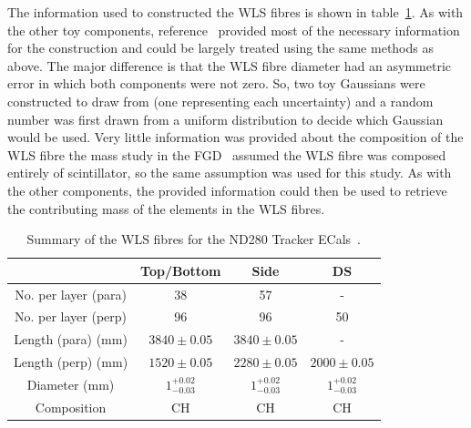 \label{subsubsec:ECalMassWLSFibres}
The information used to constructed the WLS fibres is shown in table~\ref{table:WLSFibreDimensions}.  As with the other toy components, reference~\cite{1748-0221-8-10-P10019} provided most of the necessary information for the construction and could be largely treated using the same methods as above.  The major difference is that the WLS fibre diameter had an asymmetric error in which both components were not zero.  So, two toy Gaussians were constructed to draw from (one representing each uncertainty) and a random number was first drawn from a uniform distribution to decide which Gaussian would be used.  Very little information was provided about the composition of the WLS fibre the mass study in the FGD~\cite{FGDMassTN} assumed the WLS fibre was composed entirely of scintillator, so the same assumption was used for this study.  As with the other components, the provided information could then be used to retrieve the contributing mass of the elements in the WLS fibres.
\begin{table}
  \begin{tabular}{ c c c c }
     & Top/Bottom & Side & DS \\ \hline \hline
  No. per layer (para) & 38 & 57 & - \\
  No. per layer (perp) & 96 & 96 & 50 \\
  Length (para) (mm) & $3840\pm0.05$ & $3840\pm0.05$ & - \\
  Length (perp) (mm) & $1520\pm0.05$ & $2280\pm0.05$ & $2000\pm0.05$ \\
  Diameter (mm) & $1^{+0.02}_{-0.03}$ & $1^{+0.02}_{-0.03}$ & $1^{+0.02}_{-0.03}$\\
  Composition & CH & CH & CH \\

  \end{tabular}
  \caption{Summary of the WLS fibres for the ND280 Tracker ECals~\cite{1748-0221-8-10-P10019}.}
  \label{table:WLSFibreDimensions}
\end{table}


